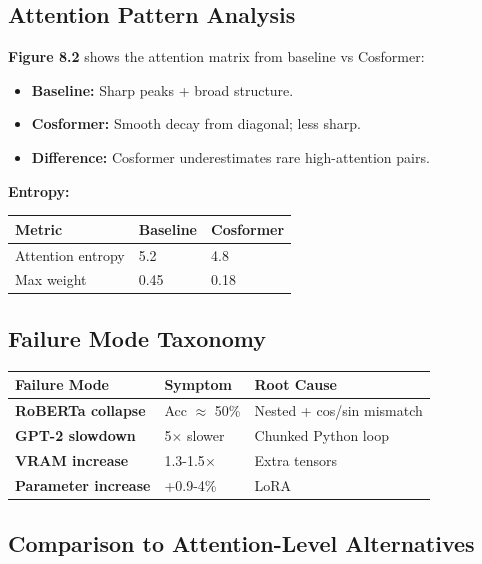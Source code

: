 \subsection{Attention Pattern Analysis}

\textbf{Figure 8.2} shows the attention matrix from baseline vs Cosformer:

\begin{itemize}
\item \textbf{Baseline:} Sharp peaks + broad structure.
\item \textbf{Cosformer:} Smooth decay from diagonal; less sharp.
\item \textbf{Difference:} Cosformer underestimates rare high-attention pairs.

\end{itemize}
\textbf{Entropy:}

\begin{table}[H]
\centering
\small
\begin{tabular}{lll}
\toprule
\textbf{Metric} & \textbf{Baseline} & \textbf{Cosformer} \\
\midrule
Attention entropy & 5.2 & 4.8 \\
Max weight & 0.45 & 0.18 \\
\bottomrule
\end{tabular}
\end{table}

\subsection{Failure Mode Taxonomy}

\begin{table}[H]
\centering
\small
\begin{tabular}{lll}
\toprule
\textbf{Failure Mode} & \textbf{Symptom} & \textbf{Root Cause} \\
\midrule
\textbf{RoBERTa collapse} & Acc $\approx$ 50\% & Nested + cos/sin mismatch \\
\textbf{GPT-2 slowdown} & 5$\times$ slower & Chunked Python loop \\
\textbf{VRAM increase} & 1.3-1.5$\times$ & Extra tensors \\
\textbf{Parameter increase} & +0.9-4\% & LoRA \\
\bottomrule
\end{tabular}
\end{table}

\subsection{Comparison to Attention-Level Alternatives}

